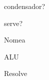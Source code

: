 \documentclass[addpoints,answer,12pt]{exam}
\begin{document}
\bracketedpoints
%
\vspace{.5cm}

\begin{center}
\end{center}
\vspace{.5cm}

\renewcommand{\solutiontitle}{\noindent \textbf{Resposta: }}

\begin{questions}
 \question[1]  
 condensador?
     
 \question[1]       
serve?

\question[1] 
Nomea
	\begin{solution}
	ALU
	\end{solution}
\question[1] 
Resolve

 \end{questions}
 

\begin{figure}[h!]
\begin{center}
\end{center}
\end{figure}
\gradetable[h][questions]


\newpage
\end{document}
